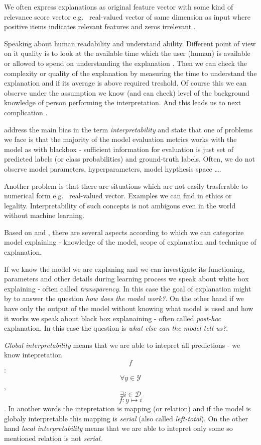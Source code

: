 We often express explanations as original feature vector with some kind of relevance score vector e.g. \ real-valued vector of same dimension as input where positive items indicates relevant features and zeros irrelevant \cite{Montavon2018}.

Speaking about human readability and understand ability. Different point of view on it quality is to look at the available time which the user (human) is available or allowed to spend on understanding the explanation \cite{Guidotti2018}. Then we can check the complexity or quality of the explanation by measuring the time to understand the explanation and if its average is above required treshold. Of course this we can observe under the assumption we know (and can check) level of the background knowledge of person performing the interpretation. And this leads us to next complication \cite{Guidotti2018}.

\citet{Montavon2018} address the main bias in the term \emph{interpretability} and state that one of problems we face is that the majority of the model evaluation metrics works with the model as with blackbox - sufficient information for evaluation is just set of predicted labels (or class probabilities) and ground-truth labels. Often, we do not observe model parameters, hyperparameters, model hypthesis space \dots. 

Another problem is that there are situations which are not easily trasferable to numerical form e.g. \ real-valued vector. Examples we can find in ethics or legality. Interpretability of such concepts is not ambigous even in the world without machine learning.


Based on \cite{Guidotti2018} and \cite{Lipton2016}, there are several aspects according to which we can categorize model explaining - knowledge of the model, scope of explanation and technique of explanation.

If we know the model we are explaning and we can investigate its functioning, parameters and other details during learning process we speak about white box explaining - often called \emph{transparency}. In this case the goal of explanation might by to answer the question \emph{how does the model work?}. On the other hand if we have only the output of the model without knowing what model is used and how it works we speak about black box explanaining - often called \emph{post-hoc} explanation. In this case the question is \emph{what else can the model tell us?}.

\emph{Global interpretability} means that we are able to intepret all predictions - we know intepretation $$f$$: $$\forall y \in \mathcal{Y}$$, $$\exists i \in \mathcal{D}$$ $$f: y\mapsto i$$. In another words the intepretation is mapping (or relation) and if the model is globaly interpretable this mapping is \emph{serial} (also called \emph{left-total}). On the other hand \emph{local interpretability} means that we are able to intepret only some so mentioned relation is not \emph{serial}.

